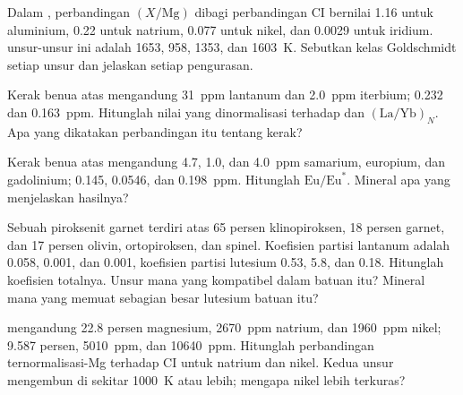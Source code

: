 \begin{exercise}[$\star$]\label{exo:b2:elements-in-the-earth:2}
Dalam , perbandingan $(X/\mathrm{Mg})$ dibagi perbandingan CI
bernilai 1.16 untuk aluminium, 0.22 untuk natrium, 0.077 untuk nikel, dan 0.0029 untuk
iridium.  unsur-unsur ini adalah 1653, 958, 1353,
dan \qty{1603}{K}. Sebutkan kelas Goldschmidt setiap unsur dan jelaskan setiap
pengurasan.
\end{exercise}

\begin{exercise}[$\star$]\label{exo:b2:elements-in-the-earth:3}
Kerak benua atas mengandung \qty{31}{ppm} lantanum dan \qty{2.0}{ppm}
iterbium;  0.232 dan \qty{0.163}{ppm}. Hitunglah nilai yang
dinormalisasi terhadap  dan $(\mathrm{La}/\mathrm{Yb})_N$. Apa yang dikatakan
perbandingan itu tentang kerak?
\end{exercise}

\begin{exercise}[$\star$]\label{exo:b2:elements-in-the-earth:4}
Kerak benua atas mengandung 4.7, 1.0, dan \qty{4.0}{ppm} samarium,
europium, dan gadolinium;  0.145, 0.0546, dan \qty{0.198}{ppm}.
Hitunglah $\mathrm{Eu}/\mathrm{Eu}^*$. Mineral apa yang menjelaskan hasilnya?
\end{exercise}

\begin{exercise}[$\star\star$]\label{exo:b2:elements-in-the-earth:5}
Sebuah piroksenit garnet terdiri atas 65 persen klinopiroksen, 18 persen garnet, dan
17 persen olivin, ortopiroksen, dan spinel. Koefisien partisi
lantanum adalah 0.058, 0.001, dan 0.001, koefisien partisi lutesium 0.53, 5.8, dan 0.18.
Hitunglah koefisien totalnya. Unsur mana yang kompatibel dalam batuan itu? Mineral
mana yang memuat sebagian besar lutesium batuan itu?
\end{exercise}

\begin{exercise}[$\star\star$]\label{exo:b2:elements-in-the-earth:6}
 mengandung 22.8 persen magnesium, \qty{2670}{ppm}
natrium, dan \qty{1960}{ppm} nikel;  9.587 persen,
\qty{5010}{ppm}, dan \qty{10640}{ppm}. Hitunglah perbandingan ternormalisasi-Mg terhadap CI untuk
natrium dan nikel. Kedua unsur mengembun di sekitar \qty{1000}{K} atau lebih; mengapa
nikel lebih terkuras?
\end{exercise}

